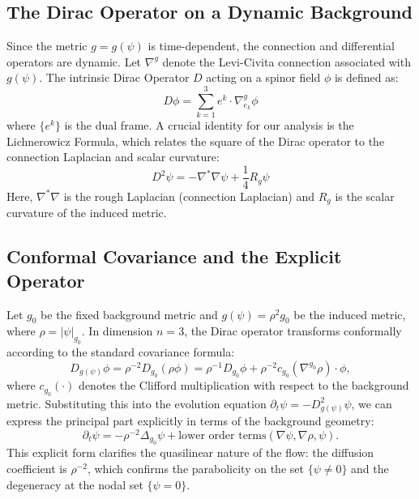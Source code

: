 \documentclass[11pt, reqno, a4paper]{amsart}
\theoremstyle{definition}
\theoremstyle{remark}
\begin{document}
\subsection{The Dirac Operator on a Dynamic Background}
Since the metric $g=g(\psi)$ is time-dependent, the connection and differential operators are dynamic. Let $\nabla^g$ denote the Levi-Civita connection associated with $g(\psi)$. The intrinsic Dirac Operator $D$ acting on a spinor field $\phi$ is defined as:
\begin{equation}
    D \phi = \sum_{k=1}^3 e^k \cdot \nabla^g_{e_k} \phi
\end{equation}
where $\{e^k\}$ is the dual frame.
A crucial identity for our analysis is the Lichnerowicz Formula, which relates the square of the Dirac operator to the connection Laplacian and scalar curvature:
\begin{equation} \label{eq:lichnerowicz}
    D^2 \psi = -\nabla^* \nabla \psi + \frac{1}{4} R_g \psi
\end{equation}
Here, $\nabla^*\nabla$ is the rough Laplacian (connection Laplacian) and $R_g$ is the scalar curvature of the induced metric.

\subsection{Conformal Covariance and the Explicit Operator}
Let $g_0$ be the fixed background metric and $g(\psi) = \rho^2 g_0$ be the induced metric, where $\rho = |\psi|_{g_0}$. In dimension $n=3$, the Dirac operator transforms conformally according to the standard covariance formula:
\begin{equation} \label{eq:conf_cov}
    D_{g(\psi)} \phi = \rho^{-2} D_{g_0} (\rho \phi) = \rho^{-1} D_{g_0} \phi + \rho^{-2} c_{g_0}(\nabla^{g_0} \rho) \cdot \phi,
\end{equation}
where $c_{g_0}(\cdot)$ denotes the Clifford multiplication with respect to the background metric.
Substituting this into the evolution equation $\partial_t \psi = -D_{g(\psi)}^2 \psi$, we can express the principal part explicitly in terms of the background geometry:
\begin{equation}
    \partial_t \psi = -\rho^{-2} \Delta_{g_0} \psi + \text{lower order terms}(\nabla \psi, \nabla \rho, \psi).
\end{equation}
This explicit form clarifies the quasilinear nature of the flow: the diffusion coefficient is $\rho^{-2}$, which confirms the parabolicity on the set $\{\psi \neq 0\}$ and the degeneracy at the nodal set $\{\psi = 0\}$.
\end{document}
